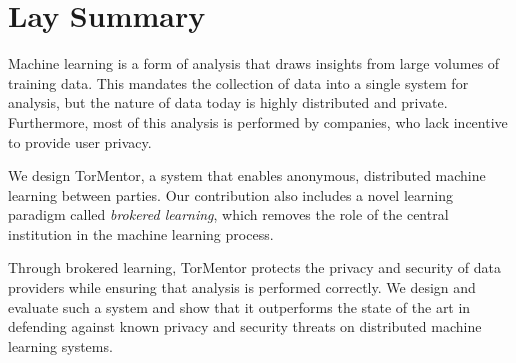 

\chapter{Lay Summary}
Machine learning is a form of analysis that draws insights from large
volumes of training data. This mandates the collection of data into a
single system for analysis, but the nature of data today is highly
distributed and private. Furthermore, most of this analysis is
performed by companies, who lack incentive to provide user privacy.

We design TorMentor, a system that enables anonymous, distributed
machine learning between parties. Our contribution also includes a
novel learning paradigm called \textit{brokered learning}, which
removes the role of the central institution in the machine learning
process.

Through brokered learning, TorMentor protects the privacy and
security of data providers while ensuring that analysis is performed
correctly. We design and evaluate such a system and show that it
outperforms the state of the art in defending against known
privacy and security threats on distributed machine learning systems.

